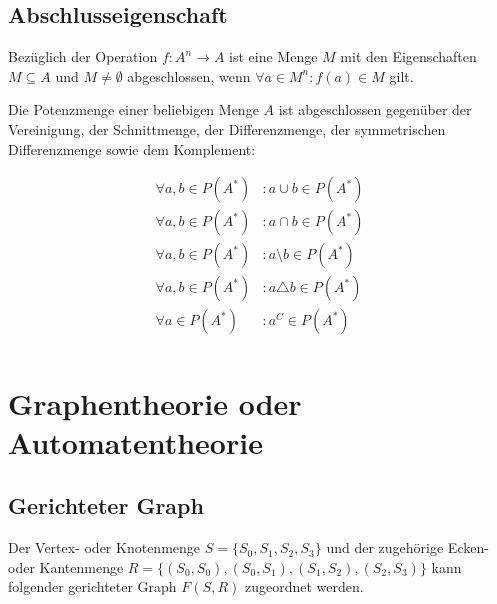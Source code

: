 \documentclass[../main.tex]{subfiles}
\begin{document}
        
        \subsection{Abschlusseigenschaft}
            Bezüglich der Operation $f: A^n \rightarrow A$ ist eine Menge $M$ mit den Eigenschaften $M \subseteq A$ und $M \not= \emptyset$ abgeschlossen, wenn $\forall a \in M^n\colon f(a) \in M$ gilt.
            
            Die Potenzmenge einer beliebigen Menge $A$ ist abgeschlossen gegenüber der Vereinigung, der Schnittmenge, der Differenzmenge, der symmetrischen Differenzmenge sowie dem Komplement:
            
            \begin{subequations}
                \begin{align}
                    \forall a,b \in P(A^*)&\colon a \cup b \in P(A^*)\\
                    \forall a,b \in P(A^*)&\colon a \cap b \in P(A^*)\\
                    \forall a,b \in P(A^*)&\colon a \setminus b \in P(A^*)\\
                    \forall a,b \in P(A^*)&\colon a \triangle b \in P(A^*)\\
                    \forall a \in P(A^*)&\colon a^C \in P(A^*)\\
                \end{align}
            \end{subequations}
        
    \section[Automatentheorie]{Graphentheorie oder Automatentheorie}
        \subsection{Gerichteter Graph}
            Der Vertex- oder Knotenmenge $S = \{S_0, S_1, S_2, S_3\}$ und der zugehörige Ecken- oder Kantenmenge $R = \{\left(S_0, S_0\right), \left(S_0, S_1\right), \left(S_1, S_2\right), \left(S_2, S_3\right)\}$ kann folgender gerichteter Graph $F\left(S, R\right)$ zugeordnet werden.
            
            \begin{center}
            \end{center}
            
\end{document}
